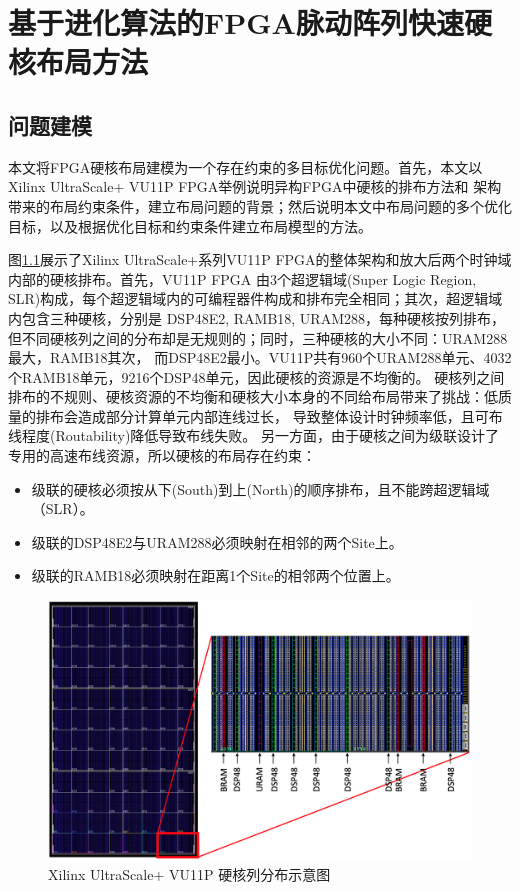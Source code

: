 \chapter{基于进化算法的FPGA脉动阵列快速硬核布局方法}



\section{问题建模}

本文将FPGA硬核布局建模为一个存在约束的多目标优化问题。首先，本文以Xilinx UltraScale+ VU11P FPGA举例说明异构FPGA中硬核的排布方法和
架构带来的布局约束条件，建立布局问题的背景；然后说明本文中布局问题的多个优化目标，以及根据优化目标和约束条件建立布局模型的方法。

图\ref{fig:architecture}展示了Xilinx UltraScale+系列VU11P FPGA的整体架构和放大后两个时钟域内部的硬核排布。首先，VU11P FPGA
由3个超逻辑域(Super Logic Region, SLR)构成，每个超逻辑域内的可编程器件构成和排布完全相同；其次，超逻辑域内包含三种硬核，分别是
DSP48E2, RAMB18, URAM288，每种硬核按列排布，但不同硬核列之间的分布却是无规则的；同时，三种硬核的大小不同：URAM288最大，RAMB18其次，
而DSP48E2最小。VU11P共有960个URAM288单元、4032个RAMB18单元，9216个DSP48单元，因此硬核的资源是不均衡的。
硬核列之间排布的不规则、硬核资源的不均衡和硬核大小本身的不同给布局带来了挑战：低质量的排布会造成部分计算单元内部连线过长，
导致整体设计时钟频率低，且可布线程度(Routability)降低导致布线失败。
另一方面，由于硬核之间为级联设计了专用的高速布线资源，所以硬核的布局存在约束：
\begin{itemize}
    \item 级联的硬核必须按从下(South)到上(North)的顺序排布，且不能跨超逻辑域（SLR）。
    \item 级联的DSP48E2与URAM288必须映射在相邻的两个Site上。
    \item 级联的RAMB18必须映射在距离1个Site的相邻两个位置上。
\end{itemize}


\begin{figure}[h]
	\centering
	\includegraphics[width=\textwidth]{figure/architecture}
	\caption{Xilinx UltraScale+ VU11P 硬核列分布示意图} 
	\label{fig:architecture}
\end{figure}

